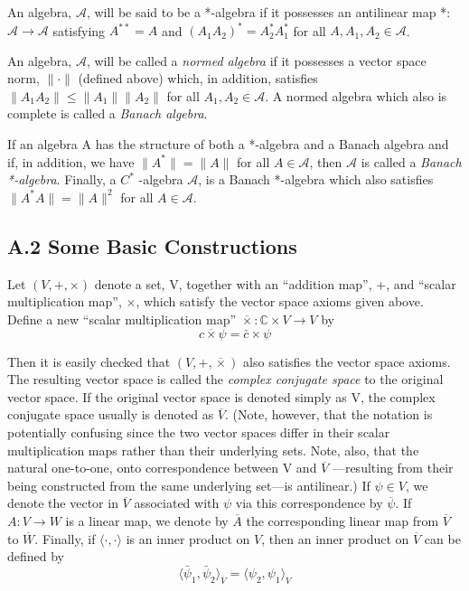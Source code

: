 \documentclass[11pt,a4paper]{article}
\begin{document}
An algebra, \(\mathcal{A}\), will be said to be a *-algebra if it possesses an antilinear map *: \(\mathcal{A} \to \mathcal{A}\) satisfying \(A^{**}=A\) and \((A_1A_2)^* = A_2^*A_1^*\) for all \(A,A_1,A_2 \in \mathcal{A}\).

An algebra, \(\mathcal{A}\), will be called a \emph{normed algebra} if it possesses a vector space norm, \(\lVert\cdot\rVert\) (defined above) which, in addition, satisfies \(\lVert A_1A_2\rVert \le \lVert A_1\rVert \lVert A_2\rVert\) for all \(A_1, A_2 \in \mathcal{A}\). A normed algebra which also is complete is called a \emph{Banach algebra}.

If an algebra A has the structure of both a *-algebra and a \hypertarget{source-203}{} Banach algebra and if, in addition, we have \(\lVert A^*\rVert = \lVert A\rVert\) for all \(A \in \mathcal{A}\), then \(\mathcal{A}\) is called a \emph{Banach *-algebra}. Finally, a \(C^*\) -algebra \(\mathcal{A}\), is a Banach *-algebra which also satisfies \(\lVert A^*A\rVert = \lVert A\rVert^2\) for all \(A \in \mathcal{A}\).

\subsection*{A.2 Some Basic Constructions}\hypertarget{sec:A.2}{}

Let \((V,+,\times)\) denote a set, V, together with an ``addition map'', +, and ``scalar multiplication map'', \(\times\), which satisfy the vector space axioms given above. Define a new ``scalar multiplication map'' \(\overline{\times}: \mathbb{C} \times V \to V\) by
\begin{equation*}
c \overline{\times} \psi=\bar c\times\psi \tag{A.2.1}\label{eq:A.2.1}
\end{equation*}

Then it is easily checked that \((V,+,\overline{\times})\) also satisfies the vector space axioms. The resulting vector space is called the \emph{complex conjugate space} to the original vector space. If the original vector space is denoted simply as V, the complex conjugate space usually is denoted as \(\overline{V}\). (Note, however, that the notation is potentially confusing since the two vector spaces differ in their scalar multiplication maps rather than their underlying sets. Note, also, that the natural one-to-one, onto correspondence between V and \(\overline{V}\) ---resulting from their being constructed from the same underlying set---is antilinear.) If \(\psi \in V\), we denote the vector in \(\overline{V}\) associated with \(\psi\) via this correspondence by \(\overline{\psi}\). If \(A:V \to W\) is a linear map, we denote by \(\overline{A}\) the corresponding linear map from \(\overline{V}\) to \(\overline{W}\). Finally, if \(\langle\cdot,\cdot\rangle\) is an inner product on \(V\), then an inner product on \(\overline{V}\) can be defined by
\begin{equation*}
\langle\bar\psi_1,\bar\psi_2\rangle_{\bar V}=\langle\psi_2,\psi_1\rangle_V \tag{A.2.2}\label{eq:A.2.2}
\end{equation*}
\end{document}
